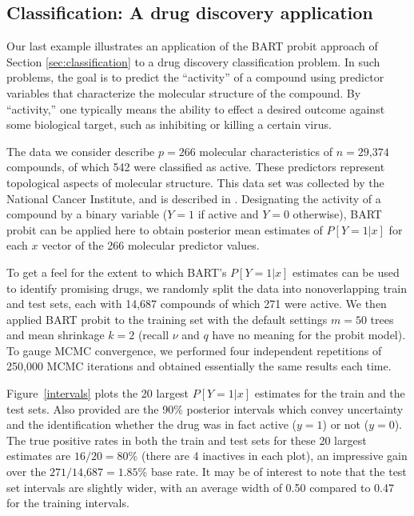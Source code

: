\documentclass[aoas,nameyear,dvips]{arximspdf}
\newcommand{\citeasnoun}[1]{\citet{#1}}
\begin{document}
\subsection{Classification: A drug discovery application}\label{sec:drugdisc}

Our last example illustrates an application of the BART probit approach
of Section \ref{sec:classification} to a drug discovery
classification problem.  In such problems, the goal is to predict
the ``activity'' of a compound using
predictor variables that characterize the molecular structure of the
compound.  By ``activity,'' one typically means the ability to effect
a desired outcome against some biological target, such as inhibiting or
killing a certain virus.

The data we consider describe $p = 266$ molecular characteristics
of $n = 29\mbox{,}374$ compounds, of which 542 were classified as active.
These predictors represent topological aspects of molecular structure.
This data set was collected by the National Cancer Institute, and is
described in \citeasnoun{Feng2003}.  Designating the activity of a compound
by a binary variable ($Y=1$ if active and $Y=0$ otherwise), BART probit can be applied here
to obtain posterior mean estimates of  $P[Y = 1  | x]$ for each $x$ vector of the 266
molecular predictor values.

To get a feel for the extent to which BART's  $P[Y = 1  | x]$ estimates
can be used to identify promising drugs, we randomly split the data
into nonoverlapping train and test sets, each with 14,687 compounds of
which 271 were active.  We then applied BART probit to the training set
with the default settings $m = 50$ trees and mean shrinkage $k = 2$
(recall $\nu$ and $q$ have no meaning for the probit model).  To gauge
MCMC convergence, we performed four independent repetitions of 250,000
MCMC iterations and obtained essentially the same results each time.

Figure~\ref{intervals} plots the 20 largest  $P[Y = 1  | x]$ estimates
for the train and the test sets.  Also provided are the 90\% posterior
intervals which convey uncertainty and the identification whether the
drug was in fact active ($y = 1$) or not ($y = 0$).  The true positive
rates in both the train and test sets for these 20 largest estimates
are $16/20 = 80$\% (there are 4 inactives in each plot), an impressive
gain over the $271/14\mbox{,}687 = 1.85$\% base rate.  It may be of interest to
note that the test set intervals are slightly wider, with an average
width of 0.50 compared to 0.47 for the training intervals.
\end{document}

